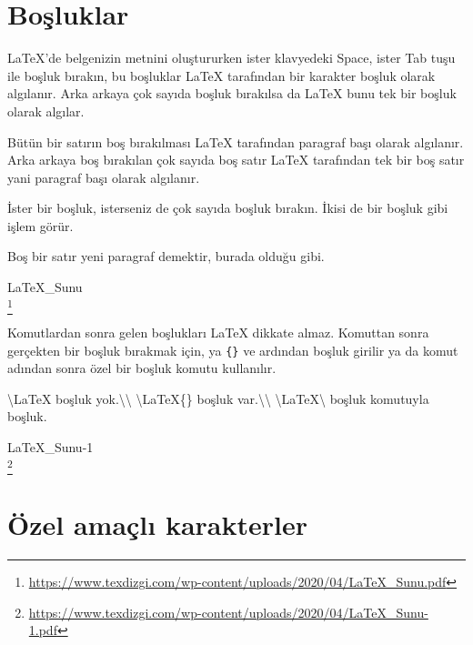 \documentclass[
  10pt,
]{scrbook}
\newenvironment{Shaded}{\begin{snugshade}}{\end{snugshade}}
\newcommand{\NormalTok}[1]{#1}
\renewcommand{\href}[2]{#2\footnote{\url{#1}}}
\begin{document}
\hypertarget{boux15fluklar}{%
\section{Boşluklar}\label{boux15fluklar}}

LaTeX'de belgenizin metnini oluştururken ister klavyedeki Space, ister
Tab tuşu ile boşluk bırakın, bu boşluklar LaTeX tarafından bir karakter
boşluk olarak algılanır. Arka arkaya çok sayıda boşluk bırakılsa da
LaTeX bunu tek bir boşluk olarak algılar.

Bütün bir satırın boş bırakılması LaTeX tarafından paragraf başı olarak
algılanır. Arka arkaya boş bırakılan çok sayıda boş satır LaTeX
tarafından tek bir boş satır yani paragraf başı olarak algılanır.

\begin{Shaded}
\begin{Highlighting}[]
\NormalTok{ İster bir boşluk, isterseniz de çok         sayıda boşluk bırakın. }
\NormalTok{İkisi de bir boşluk gibi işlem görür. }

\NormalTok{Boş bir satır yeni paragraf demektir, burada olduğu gibi.}
\end{Highlighting}
\end{Shaded}

\href{https://www.texdizgi.com/wp-content/uploads/2020/04/LaTeX_Sunu.pdf}{LaTeX\_Sunu\\
}

Komutlardan sonra gelen boşlukları LaTeX dikkate almaz. Komuttan sonra
gerçekten bir boşluk bırakmak için, ya \texttt{\{\}} ve ardından boşluk girilir
ya da komut adından sonra özel bir boşluk komutu kullanılır.

\begin{Shaded}
\begin{Highlighting}[]
\NormalTok{\textbackslash{}LaTeX  boşluk yok.\textbackslash{}\textbackslash{}}
\NormalTok{\textbackslash{}LaTeX\{\} boşluk var.\textbackslash{}\textbackslash{}}
\NormalTok{\textbackslash{}LaTeX\textbackslash{} boşluk komutuyla  boşluk.}
\end{Highlighting}
\end{Shaded}

\href{https://www.texdizgi.com/wp-content/uploads/2020/04/LaTeX_Sunu-1.pdf}{LaTeX\_Sunu-1\\
}

\hypertarget{uxf6zel-amauxe7lux131-karakterler}{%
\section{Özel amaçlı karakterler}\label{uxf6zel-amauxe7lux131-karakterler}}
\end{document}
